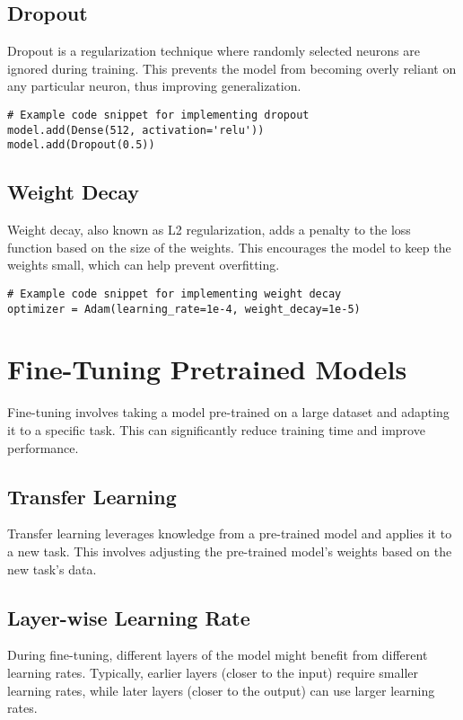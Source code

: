 \subsection{Dropout}
Dropout is a regularization technique where randomly selected neurons are ignored during training. This prevents the model from becoming overly reliant on any particular neuron, thus improving generalization.

\begin{verbatim}
# Example code snippet for implementing dropout
model.add(Dense(512, activation='relu'))
model.add(Dropout(0.5))
\end{verbatim}

\subsection{Weight Decay}
Weight decay, also known as L2 regularization, adds a penalty to the loss function based on the size of the weights. This encourages the model to keep the weights small, which can help prevent overfitting.

\begin{verbatim}
# Example code snippet for implementing weight decay
optimizer = Adam(learning_rate=1e-4, weight_decay=1e-5)
\end{verbatim}

\section{Fine-Tuning Pretrained Models}
Fine-tuning involves taking a model pre-trained on a large dataset and adapting it to a specific task. This can significantly reduce training time and improve performance.

\subsection{Transfer Learning}
Transfer learning leverages knowledge from a pre-trained model and applies it to a new task. This involves adjusting the pre-trained model's weights based on the new task's data.

\subsection{Layer-wise Learning Rate}
During fine-tuning, different layers of the model might benefit from different learning rates. Typically, earlier layers (closer to the input) require smaller learning rates, while later layers (closer to the output) can use larger learning rates.

